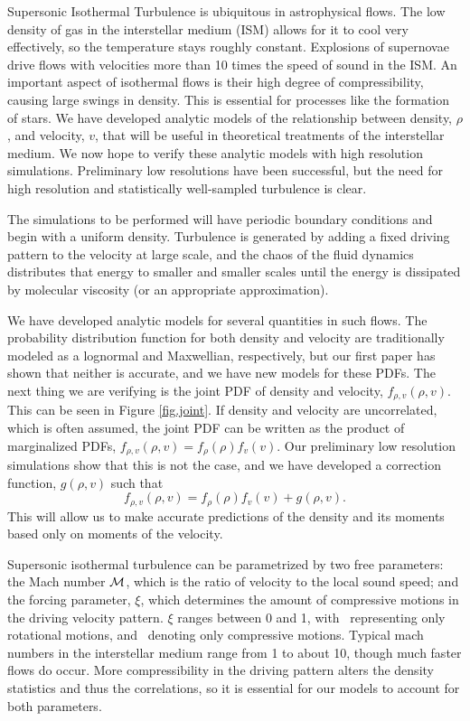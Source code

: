 Supersonic Isothermal Turbulence is ubiquitous in astrophysical flows.  The low
density of gas in the interstellar medium (ISM) allows for it to cool very
effectively, so the temperature stays roughly constant. Explosions of supernovae
drive flows with velocities more than 10 times the speed of sound in the
ISM.
An important aspect of isothermal flows is their high degree of compressibility,
causing large swings in density.  This 
is essential for processes like the formation of stars.  
We have developed
analytic models of the relationship between  density, $\rho$, and velocity, $v$, that
will be useful in theoretical treatments of the interstellar medium.  We now
hope to verify these analytic models with high resolution simulations.
Preliminary low resolutions have been successful, but the need for high
resolution and statistically well-sampled turbulence is clear.

The simulations to be performed will have periodic boundary conditions and begin
with a uniform density.  Turbulence is generated by adding a fixed driving
pattern to the velocity
 at large scale, and the chaos of the fluid
dynamics distributes that energy to smaller and smaller scales until the energy
is dissipated by molecular viscosity (or an appropriate approximation).

We have developed analytic models for several quantities in such flows.  The
probability distribution function for both density and velocity are
traditionally modeled as a lognormal and Maxwellian, respectively, but our first
paper has shown that neither is accurate, and we have new models for these PDFs.  The next thing we are
verifying is the joint PDF of density and velocity, $f_{\rho,v}(\rho,v)$.  This
can be seen in Figure \ref{fig.joint}.  If
density and velocity are uncorrelated, which is often assumed, the joint PDF can be written as the
product of marginalized PDFs, $f_{\rho,v}(\rho,v)=f_\rho(\rho) f_v(v)$.  Our
preliminary low resolution simulations show that this is not the case, and we have
developed a correction function, $g(\rho,v)$ such that 
$$
f_{\rho,v}(\rho,v)=f_\rho(\rho) f_v(v) + g(\rho,v).
$$
This will allow us to make accurate predictions of the density and its moments
based only on moments of the velocity.

Supersonic isothermal turbulence can be parametrized by two free parameters: the
Mach number $\mathcal{M}$, which is the
ratio of velocity to the local sound speed; and the forcing parameter, $\xi$,
which determines the amount of compressive motions in the driving velocity
pattern.
$\xi$ ranges between 0 and 1, with \xis\ representing only rotational motions,
and \xic\ denoting only compressive motions.  Typical mach numbers in the
interstellar medium range from 1
to about 10, though much faster flows do occur.  More compressibility in the driving pattern alters the density statistics and
thus the correlations, so it is essential for our models to account for both
parameters. 

